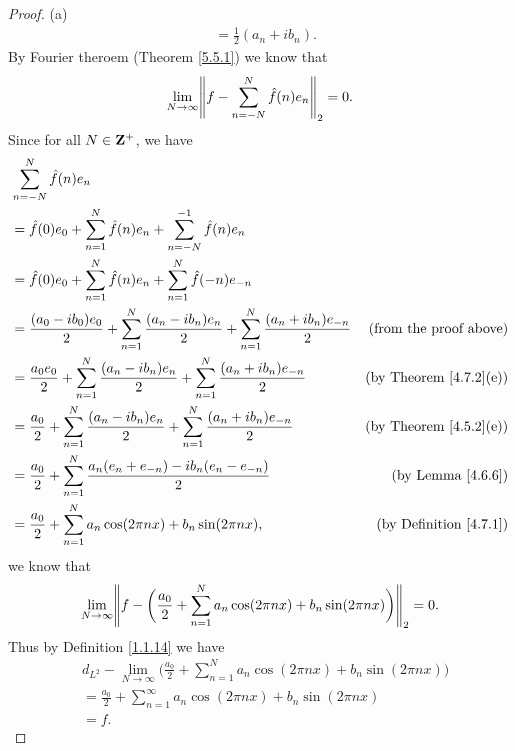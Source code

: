 \begin{proof}{(a)}
\begin{align*}
         & = \frac{1}{2} (a_n + i b_n).
    \end{align*}
    By Fourier theroem (Theorem \ref{5.5.1}) we know that
    \[
        \lim_{N \to \infty} \norm*{f - \sum_{n = -N}^N \hat{f}(n) e_n}_2 = 0.
    \]
    Since for all \(N \in \mathbf{Z}^+\), we have
    \begin{align*}
         & \sum_{n = -N}^N \hat{f}(n) e_n                                                                                                                                  \\
         & = \hat{f}(0) e_0 + \sum_{n = 1}^N \hat{f}(n) e_n + \sum_{n = -N}^{-1} \hat{f}(n) e_n                                                                            \\
         & = \hat{f}(0) e_0 + \sum_{n = 1}^N \hat{f}(n) e_n + \sum_{n = 1}^N \hat{f}(-n) e_{-n}                                                                            \\
         & = \frac{(a_0 - i b_0) e_0}{2} + \sum_{n = 1}^N \frac{(a_n - i b_n) e_n}{2} + \sum_{n = 1}^N \frac{(a_n + i b_n) e_{-n}}{2} & \text{(from the proof above)}      \\
         & = \frac{a_0 e_0}{2} + \sum_{n = 1}^N \frac{(a_n - i b_n) e_n}{2} + \sum_{n = 1}^N \frac{(a_n + i b_n) e_{-n}}{2}           & \text{(by Theorem \ref{4.7.2}(e))} \\
         & = \frac{a_0}{2} + \sum_{n = 1}^N \frac{(a_n - i b_n) e_n}{2} + \sum_{n = 1}^N \frac{(a_n + i b_n) e_{-n}}{2}               & \text{(by Theorem \ref{4.5.2}(e))} \\
         & = \frac{a_0}{2} + \sum_{n = 1}^N \frac{a_n (e_n + e_{-n}) - i b_n (e_n - e_{-n})}{2}                                       & \text{(by Lemma \ref{4.6.6})}      \\
         & = \frac{a_0}{2} + \sum_{n = 1}^N a_n \cos(2 \pi n x) + b_n \sin(2 \pi n x),                                                & \text{(by Definition \ref{4.7.1})}
    \end{align*}
    we know that
    \[
        \lim_{N \to \infty} \norm*{f - \bigg(\frac{a_0}{2} + \sum_{n = 1}^N a_n \cos(2 \pi n x) + b_n \sin(2 \pi n x)\bigg)}_2 = 0.
    \]
    Thus by Definition \ref{1.1.14} we have
    \begin{align*}
         & d_{L^2} - \lim_{N \to \infty} \bigg(\frac{a_0}{2} + \sum_{n = 1}^N a_n \cos(2 \pi n x) + b_n \sin(2 \pi n x)\bigg) \\
         & = \frac{a_0}{2} + \sum_{n = 1}^\infty a_n \cos(2 \pi n x) + b_n \sin(2 \pi n x)                                    \\
         & = f.
    \end{align*}
\end{proof}

